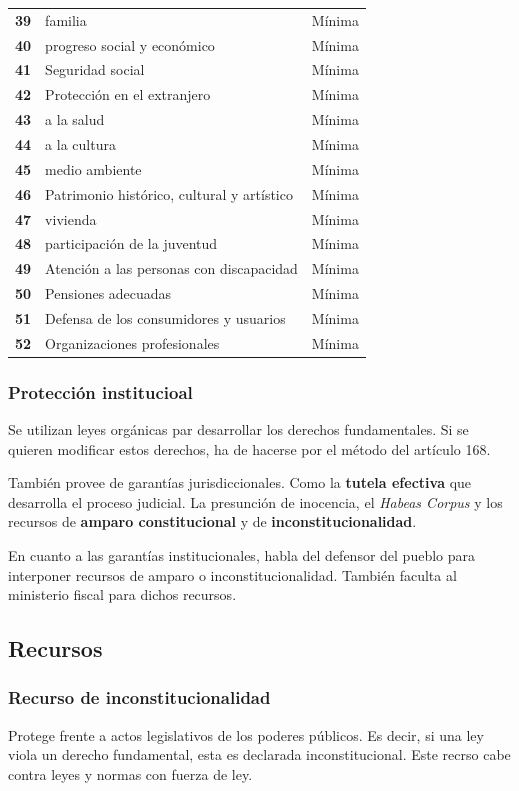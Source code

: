 \begin{table}[H]
\begin{tabular}{>{\bfseries}rll}
        39 & familia & Mínima \\
        40 & progreso social y económico & Mínima \\
        41 & Seguridad social  & Mínima \\
        42 & Protección en el extranjero & Mínima \\
        43 & a la salud  & Mínima \\
        44 & a la cultura  & Mínima \\
        45 & medio ambiente  & Mínima \\
        46 & Patrimonio histórico, cultural y artístico & Mínima \\
        47 & vivienda  & Mínima \\
        48 & participación de la juventud & Mínima \\
        49 & Atención a las personas con discapacidad & Mínima \\
        50 & Pensiones adecuadas & Mínima \\
        51 & Defensa de los consumidores y usuarios & Mínima \\
        52 & Organizaciones profesionales & Mínima \\
        \end{tabular}
        \end{table}

    \subsubsection{Protección institucioal}
        Se utilizan leyes orgánicas par desarrollar los derechos fundamentales. Si se quieren modificar estos derechos, ha de hacerse por el método del artículo 168.

        También provee de garantías jurisdiccionales. Como la \textbf{tutela efectiva} que desarrolla el proceso judicial. La presunción de inocencia, el \textit{Habeas Corpus} y los recursos de \textbf{amparo constitucional} y de \textbf{inconstitucionalidad}.

        En cuanto a las garantías institucionales, habla del defensor del pueblo para interponer recursos de amparo o inconstitucionalidad. También faculta al ministerio fiscal para dichos recursos.

\subsection{Recursos}
    \subsubsection{Recurso de inconstitucionalidad}
        Protege frente a actos legislativos de los poderes públicos. Es decir, si una ley viola un derecho fundamental, esta es declarada inconstitucional. Este recrso cabe contra leyes y normas con fuerza de ley.

